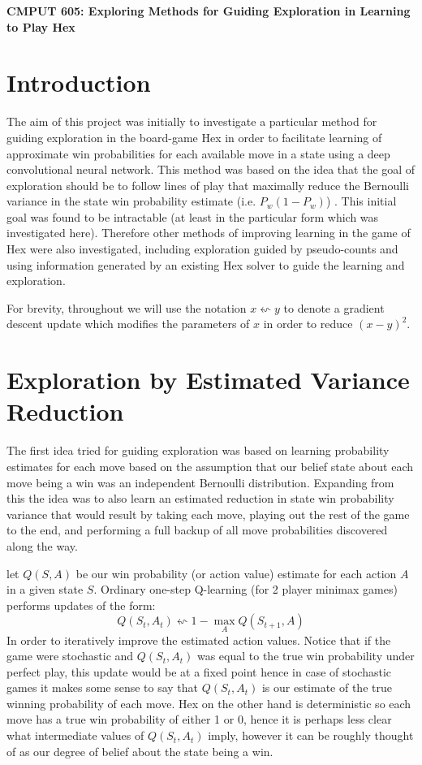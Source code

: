 \documentclass{article}
\begin{document}
\begin{center}
{\Large \textbf{CMPUT 605: Exploring Methods for Guiding Exploration in Learning to Play Hex}}
\end{center}
\section*{Introduction}
The aim of this project was initially to investigate a particular method for guiding exploration in the board-game Hex in order to facilitate learning of approximate win probabilities for each available move in a state using a deep convolutional neural network. This method was based on the idea that the goal of exploration should be to follow lines of play that maximally reduce the Bernoulli variance in the state win probability estimate (i.e. $P_w(1-P_w)$) . This initial goal was found to be intractable (at least in the particular form which was investigated here). Therefore other methods of improving learning in the game of Hex were also investigated, including exploration guided by pseudo-counts and using information generated by an existing Hex solver to guide the learning and exploration.

For brevity, throughout we will use the notation $x\leftsquigarrow y$ to denote a gradient descent update which modifies the parameters of $x$ in order to reduce $(x-y)^2$.

\section*{Exploration by Estimated Variance Reduction}
The first idea tried for guiding exploration was based on learning probability estimates for each move based on the assumption that our belief state about each move being a win was an independent Bernoulli distribution. Expanding from this the idea was to also learn an estimated reduction in state win probability variance that would result by taking each move, playing out the rest of the game to the end, and performing a full backup of all move probabilities discovered along the way.

let $Q(S,A)$ be our win probability (or action value) estimate for each action $A$ in a given state $S$. Ordinary one-step Q-learning (for 2 player minimax games) performs updates of the form:
$$Q(S_t,A_t)\leftsquigarrow 1-\max_A Q(S_{t+1},A)$$
In order to iteratively improve the estimated action values. Notice that if the game were stochastic and $Q(S_t,A_t)$ was equal to the true win probability under perfect play, this update would be at a fixed point hence in case of stochastic games it makes some sense to say that $Q(S_t,A_t)$ is our estimate of the true winning probability of each move. Hex on the other hand is deterministic so each move has a true win probability of either 1 or 0, hence it is perhaps less clear what intermediate values of $Q(S_t,A_t)$ imply, however it can be roughly thought of as our degree of belief about the state being a win.
\end{document}
